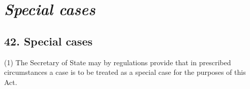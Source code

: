 \documentclass[12pt,a4paper]{article}
\begin{document}
%
%
%


\section{\itshape Special cases}

\subsection{42. Special cases}

(1) The Secretary of State may by regulations provide that in prescribed circumstances a case is to be treated as a special case for the purposes of this Act.
\end{document}
